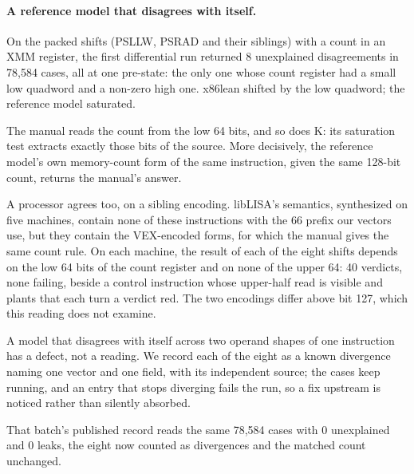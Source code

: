 \documentclass[runningheads]{llncs}
\newcommand{\src}[1]{}  %
\begin{document}
\paragraph{A reference model that disagrees with itself.}
On the packed shifts (PSLLW, PSRAD and their siblings) with a count in an XMM register, the first
differential run returned 8 unexplained disagreements in 78{,}584 cases, all at one pre-state: the only
one whose count register had a small low quadword and a non-zero high one. x86lean shifted by the low
quadword; the reference model saturated.
\src{docs/CLAIMS.tsv[d108\_unexplained, d108\_cases]; docs/DECISIONS.md D108 1}
The manual reads the count from the low 64 bits, and so does K: its saturation test extracts exactly
those bits of the source. More decisively, the reference model's own memory-count form of the same
instruction, given the same 128-bit count, returns the manual's answer.
\src{docs/DECISIONS.md D108 3, citing K's psllw\_xmm\_xmm.k}
A processor agrees too, on a sibling encoding. libLISA's semantics, synthesized on five machines, contain
none of these instructions with the 66 prefix our vectors use, but they contain the VEX-encoded forms, for
which the manual gives the same count rule. On each machine, the result of each of the eight shifts depends
on the low 64 bits of the count register and on none of the upper 64: 40 verdicts, none failing, beside a
control instruction whose upper-half read is visible and plants that each turn a verdict red. The two
encodings differ above bit 127, which this reading does not examine.
\src{docs/LIBLISA-HARDWARE-CHECK-2026-09-12.md; scripts/liblisa\_hardware\_check.py;
docs/CLAIMS.tsv[liblisa\_shift\_verdicts\_pass, liblisa\_shift\_forms, liblisa\_machines]; docs/DECISIONS.md D221}
A model that disagrees with itself across two operand shapes of one instruction has a defect, not a
reading. We record each of the eight as a known divergence naming one vector and one field, with its
independent source; the cases keep running, and an entry that stops diverging fails the run, so a fix
upstream is noticed rather than silently absorbed.
\src{Main.lean knownDivergences; docs/DECISIONS.md D108 4}
That batch's published record reads the same 78{,}584 cases with 0 unexplained and 0 leaks, the
eight now counted as divergences and the matched count unchanged.
\src{docs/DIFFERENTIAL-P2-BATCH11.md:138-139, the eleventh differential record, which is batch 13 in docs/DECISIONS.md D108; docs/CLAIMS.tsv[p2\_shift\_record\_cases, p2\_shift\_record\_unexplained];
matched 58,052 and explained 29,435 in both records, divergences 163 -> 171. This sentence read 81,752 until 2026-09-15, the count of
DIFFERENTIAL-P2-BATCH13.md, which is a later batch's record with 36 more vectors (the two counters that file's header names); docs/DECISIONS.md D249}
\end{document}
